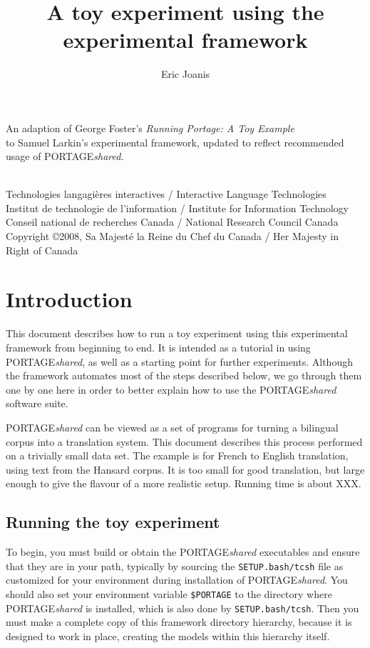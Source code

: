 \documentclass[11pt]{article}
\title{A toy experiment using the \PS \\
       experimental framework}
\date{}
\author{Eric Joanis}
\newcommand{\PS}{PORTAGE\emph{shared}\xspace}
\begin{document}
\maketitle

\begin{center}
An adaption of George Foster's \emph{Running Portage: A Toy Example} \\
to Samuel Larkin's experimental framework, updated to reflect recommended usage
of \PS.
\end{center}

\begin{center}
{~} \\ \tiny
   Technologies langagi{\`e}res interactives /
      Interactive Language Technologies \\
   Institut de technologie de l'information /
      Institute for Information Technology \\
   Conseil national de recherches Canada /
      National Research Council Canada \\
   Copyright \copyright 2008, Sa Majest{\'e} la Reine du Chef du Canada /
      Her Majesty in Right of Canada
\end{center}

\section{Introduction}

This document describes how to run a toy experiment using this experimental
framework from beginning to end.  It is intended as a tutorial in using \PS, as
well as a starting point for further experiments.  Although the framework
automates most of the steps described below, we go through them one by one here
in order to better explain how to use the \PS software suite.

\PS can be viewed as a set of programs for turning a bilingual corpus into a
translation system.  This document describes this process performed on a
trivially small data set.  The example is for French to English translation,
using text from the Hansard corpus.  It is too small for good translation, but
large enough to give the flavour of a more realistic setup. Running time is
about XXX.

\subsection{Running the toy experiment}

To begin, you must build or obtain the \PS executables and ensure that they are
in your path, typically by sourcing the \texttt{SETUP.bash/tcsh} file as
customized for your environment during installation of \PS.  You should also
set your environment variable \texttt{\$PORTAGE} to the directory where \PS is
installed, which is also done by \texttt{SETUP.bash/tcsh}.  Then you must make
a complete copy of this framework directory hierarchy, because it is designed
to work in place, creating the models within this hierarchy itself.
\end{document}
